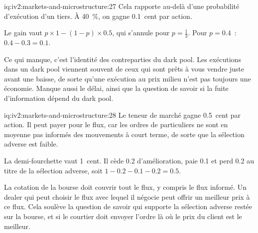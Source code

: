 \begin{solution}{iq:iv2:markets-and-microstructure:27}
Cela rapporte au-delà d'une probabilité d'exécution d'un tiers. À 40~\%, on gagne 0.1~cent par action.

Le gain vaut $p \times 1 - (1 - p) \times 0.5$, qui s'annule pour $p = \tfrac13$. Pour $p = 0.4$~: $0.4 - 0.3 = 0.1$.

Ce qui manque, c'est l'identité des contreparties du dark pool. Les exécutions dans un dark pool viennent souvent de ceux qui sont prêts à vous vendre juste avant une baisse, de sorte qu'une exécution au prix milieu n'est pas toujours une économie. Manque aussi le délai, ainsi que la question de savoir si la fuite d'information dépend du dark pool.

\end{solution}

\begin{solution}{iq:iv2:markets-and-microstructure:28}
Le teneur de marché gagne 0.5~cent par action. Il peut payer pour le flux, car les ordres de particuliers ne sont en moyenne pas informés des mouvements à court terme, de sorte que la sélection adverse est faible.

La demi-fourchette vaut 1~cent. Il cède 0.2 d'amélioration, paie 0.1 et perd 0.2 au titre de la sélection adverse, soit $1 - 0.2 - 0.1 - 0.2 = 0.5$.

La cotation de la bourse doit couvrir tout le flux, y compris le flux informé. Un dealer qui peut choisir le flux avec lequel il négocie peut offrir un meilleur prix à ce flux. Cela soulève la question de savoir qui supporte la sélection adverse restée sur la bourse, et si le courtier doit envoyer l'ordre là où le prix du client est le meilleur.

\end{solution}

